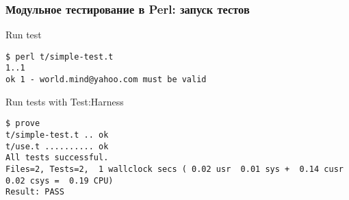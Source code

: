 \documentclass{beamer}
\begin{document}
\begin{frame}[fragile]
\frametitle{Модульное тестирование в Perl: запуск тестов}
\begin{block}{Run test}
\begin{lstlisting}
$ perl t/simple-test.t
1..1
ok 1 - world.mind@yahoo.com must be valid
\end{lstlisting}
\end{block}
\begin{block}{Run tests with Test:Harness}
\begin{lstlisting}
$ prove
t/simple-test.t .. ok   
t/use.t .......... ok   
All tests successful.
Files=2, Tests=2,  1 wallclock secs ( 0.02 usr  0.01 sys +  0.14 cusr  0.02 csys =  0.19 CPU)
Result: PASS
\end{lstlisting}
\end{block}
\end{frame}

\begin{frame}
\end{frame}

\begin{frame}
\end{frame}

\begin{frame}
\end{frame}

\begin{frame}
\end{frame}

\begin{frame}
\end{frame}

\begin{frame}
\end{frame}
\end{document}
